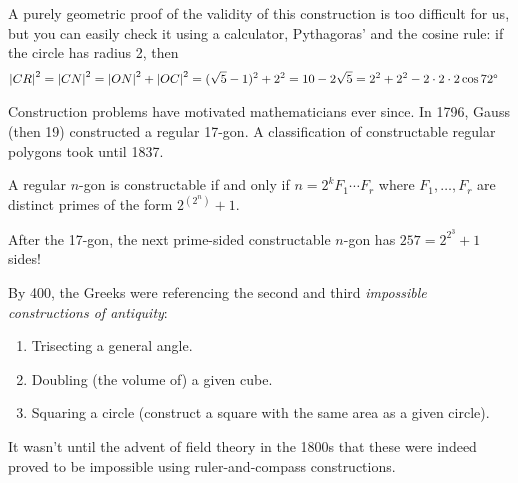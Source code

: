 A purely geometric proof of the validity of this construction is too difficult for us, but you can easily check it using a calculator, Pythagoras' and the cosine rule:  if the circle has radius 2, then
\begin{align*}
	\nm{CR}^2&=\nm{CN}^2=\nm{ON}^2+\nm{OC}^2=(\sqrt 5-1)^2+2^2=10-2\sqrt 5 =2^2+2^2-2\cdot 2\cdot 2\cos\ang{72}
\end{align*}\goodbreak


Construction problems have motivated mathematicians ever since. In 1796, Gauss (then 19) constructed a regular 17-gon. A classification of constructable regular polygons took until 1837.

\begin{thm*}{}{}
	A regular $n$-gon is constructable if and only if $n=2^kF_1\cdots F_r$ where $F_1,\ldots,F_r$ are distinct primes of the form $2^{(2^n)}+1$.
\end{thm*}

After the 17-gon, the next prime-sided constructable $n$-gon has $257=2^{2^3}+1$ sides!\smallbreak

By 400\BC, the Greeks were referencing the second and third \emph{impossible constructions of antiquity}:
\begin{enumerate}\itemsep0pt
  \item Trisecting a general angle.
  \item Doubling (the volume of) a given cube.
  \item Squaring a circle (construct a square with the same area as a given circle).\footnotemark
\end{enumerate}
It wasn't until the advent of field theory in the 1800s that these were indeed proved to be impossible using ruler-and-compass constructions.







